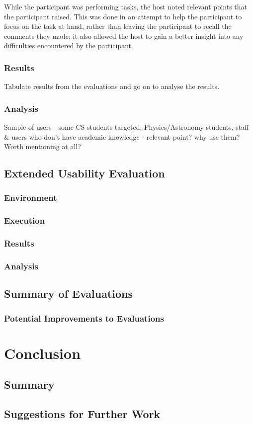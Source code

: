 \documentclass{l4proj}
\begin{document}
While the participant was performing tasks, the host noted relevant points that the participant raised.  This was done in an attempt to help the participant to focus on the task at hand, rather than leaving the participant to recall the comments they made; it also allowed the host to gain a better insight into any difficulties encountered by the participant.

\subsection{Results}
Tabulate results from the evaluations and go on to analyse the results.

\subsection{Analysis}
Sample of users - some CS students targeted, Physics/Astronomy students, staff \& users who don't have academic knowledge - relevant point? why use them? Worth mentioning at all?

\section{Extended Usability Evaluation}

\subsection{Environment}
\subsection{Execution}
\subsection{Results}
\subsection{Analysis}

\section{Summary of Evaluations}

\subsection{Potential Improvements to Evaluations}



\chapter{Conclusion}
\label{conclusion}

\section{Summary}

\section{Suggestions for Further Work}

\appendix
\printglossaries



\end{document}
